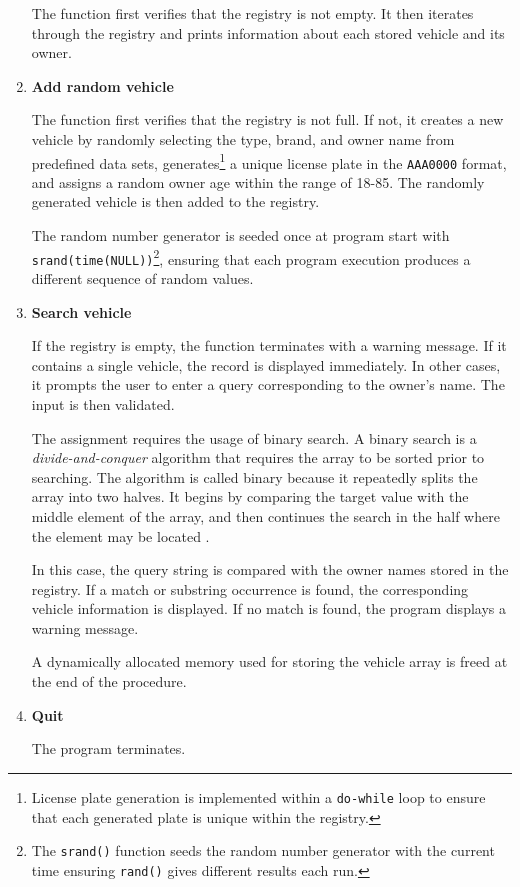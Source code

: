 \documentclass[12pt, a4paper]{article}
\begin{document}
\begin{enumerate}
The function first verifies that the registry is not empty. It then iterates through the registry and prints information about each stored vehicle and its owner. 

  \item \textbf{Add random vehicle}

 The function first verifies that the registry is not full. If not, it creates a new vehicle by randomly selecting the type, brand, and owner name from predefined data sets, generates\footnote{License plate generation is implemented within a \texttt{do-while} loop to ensure that each generated plate is unique within the registry.} a unique license plate in the \texttt{AAA0000} format, and assigns a random owner age within the range of 18-85. The randomly generated vehicle is then added to the registry.

The random number generator is seeded once at program start with \\ \texttt{srand(time(NULL))}\footnote{The \texttt{srand()} function seeds the random number generator with the current time ensuring \texttt{rand()} gives different results each run.}, ensuring that each program execution produces a different sequence of random values.

  \item \textbf{Search vehicle}

    If the registry is empty, the function terminates with a warning message. If it contains a single vehicle, the record is displayed immediately. In other cases, it prompts the user to enter a query corresponding to the owner’s name. The input is then validated.
    
    The assignment requires the usage of binary search. A binary search is a \textit{divide-and-conquer} algorithm that requires the array to be sorted prior to searching. The algorithm is called binary because it repeatedly splits the array into two halves. It begins by comparing the target value with the middle element of the array, and then continues the search in the half where the element may be located \cite{bbc_binarysearch}.

    In this case, the query string is compared with the owner names stored in the registry. If a match or substring occurrence is found, the corresponding vehicle information is displayed. If no match is found, the program displays a warning message.
    
    A dynamically allocated memory used for storing the vehicle array is freed at the end of the procedure.

  \item \textbf{Quit}
  
  The program terminates.
\end{enumerate}
\end{document}
